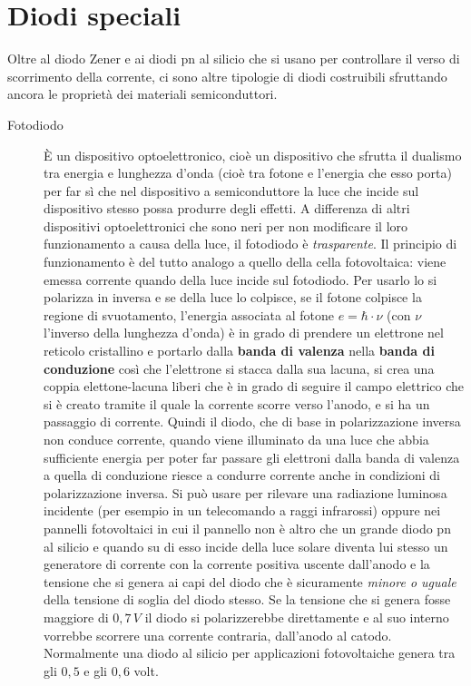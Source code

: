 \documentclass[12pt, a4paper]{report}
\begin{document}
\section{Diodi speciali}
Oltre al diodo Zener e ai diodi pn al silicio che si usano per controllare il verso di scorrimento della corrente, ci sono altre tipologie di diodi costruibili sfruttando ancora le proprietà dei materiali semiconduttori.
\begin{description}
    \item[Fotodiodo] È un dispositivo optoelettronico, cioè un dispositivo che sfrutta il dualismo tra energia e lunghezza d'onda (cioè tra fotone e l'energia che esso porta) per far sì che nel dispositivo a semiconduttore la luce che incide sul dispositivo stesso possa produrre degli effetti. A differenza di altri dispositivi optoelettronici che sono neri per non modificare il loro funzionamento a causa della luce, il fotodiodo è \textit{trasparente}. Il principio di funzionamento è del tutto analogo a quello della cella fotovoltaica: viene emessa corrente quando della luce incide sul fotodiodo. Per usarlo lo si polarizza in inversa e se della luce lo colpisce, se il fotone colpisce la regione di svuotamento, l'energia associata al fotone $e = \hbar \cdot \nu$ (con $\nu$ l'inverso della lunghezza d'onda) è in grado di prendere un elettrone nel reticolo cristallino e portarlo dalla \textbf{banda di valenza} nella \textbf{banda di conduzione} così che l'elettrone si stacca dalla sua lacuna, si crea una coppia elettone-lacuna liberi che è in grado di seguire il campo elettrico che si è creato tramite il quale la corrente scorre verso l'anodo, e si ha un passaggio di corrente. Quindi il diodo, che di base in polarizzazione inversa non conduce corrente, quando viene illuminato da una luce che abbia sufficiente energia per poter far passare gli elettroni dalla banda di valenza a quella di conduzione riesce a condurre corrente anche in condizioni di polarizzazione inversa. Si può usare per rilevare una radiazione luminosa incidente (per esempio in un telecomando a raggi infrarossi) oppure nei pannelli fotovoltaici in cui il pannello non è altro che un grande diodo pn al silicio e quando su di esso incide della luce solare diventa lui stesso un generatore di corrente con la corrente positiva uscente dall'anodo e la tensione che si genera ai capi del diodo che è sicuramente \textit{minore o uguale} della tensione di soglia del diodo stesso. Se la tensione che si genera fosse maggiore di $0,7\,V$ il diodo si polarizzerebbe direttamente e al suo interno vorrebbe scorrere una corrente contraria, dall'anodo al catodo. Normalmente una diodo al silicio per applicazioni fotovoltaiche genera tra gli $0,5$ e gli $0,6$ volt.

\end{description}
\end{document}

